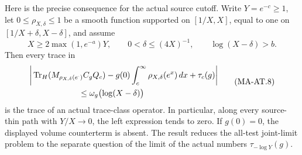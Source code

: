 Here is the precise consequence for the actual source cutoff.
Write \(Y=e^{-c}\ge1\), let \(0\le\rho_{X,\delta}\le1\) be a smooth
function supported on \([1/X,X]\), equal to one on
\([1/X+\delta,X-\delta]\), and assume
\[
 X\ge 2\max(1,e^{-a})Y,\qquad
 0<\delta\le(4X)^{-1},\qquad \log(X-\delta)>b.
 \tag{MA-AT.7}
\]
Then every trace in
\[
 \begin{split}
 \bigg|&
 \operatorname{Tr}_H(M_{\rho_{X,\delta}(e^\cdot)}C_gQ_c)
       -g(0)\int_c^\infty\rho_{X,\delta}(e^x)\,dx
       +\tau_c(g)\bigg|\\
 &\hspace{20mm}\le
       \omega_g\bigl(\log(X-\delta)\bigr)
 \end{split}
 \tag{MA-AT.8}
\]
is the trace of an actual trace-class operator.
In particular, along every source-thin path with \(Y/X\to0\),
the left expression tends to zero.  If \(g(0)=0\), the displayed
volume counterterm is absent.  The result reduces the all-test
joint-limit problem to the separate question of the limit of
the actual numbers \(\tau_{-\log Y}(g)\).

